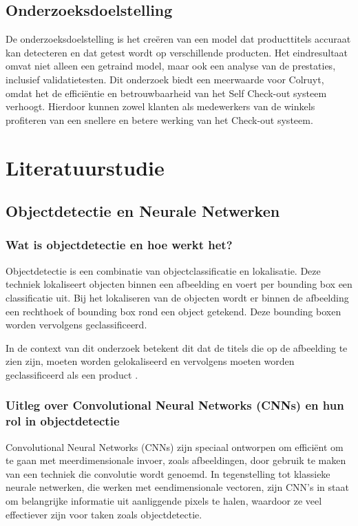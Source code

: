 \subsection*{Onderzoeksdoelstelling}
De onderzoeksdoelstelling is het creëren van een model dat producttitels accuraat kan detecteren en dat getest wordt op verschillende producten. Het eindresultaat omvat niet alleen een getraind model, maar ook een analyse van de prestaties, inclusief validatietesten. Dit onderzoek biedt een meerwaarde voor Colruyt, omdat het de efficiëntie en betrouwbaarheid van het Self Check-out systeem verhoogt. Hierdoor kunnen zowel klanten als medewerkers van de winkels profiteren van een snellere en betere werking van het Check-out systeem.


\section{Literatuurstudie}%
\label{sec:literatuurstudie}

\subsection{Objectdetectie en Neurale Netwerken}

\subsubsection{Wat is objectdetectie en hoe werkt het?}
Objectdetectie is een combinatie van objectclassificatie en lokalisatie. Deze techniek lokaliseert objecten binnen een afbeelding en voert per bounding box een classificatie uit. Bij het lokaliseren van de objecten wordt er binnen de afbeelding een rechthoek of bounding box rond een object getekend. Deze bounding boxen worden vervolgens geclassificeerd.

In de context van dit onderzoek betekent dit dat de titels die op de afbeelding te zien zijn, moeten worden gelokaliseerd en vervolgens moeten worden geclassificeerd als een product \autocite{wulteputteefficient}.

\subsubsection{Uitleg over Convolutional Neural Networks (CNNs) en hun rol in objectdetectie}
Convolutional Neural Networks (CNNs) zijn speciaal ontworpen om efficiënt om te gaan met meerdimensionale invoer, zoals afbeeldingen, door gebruik te maken van een techniek die convolutie wordt genoemd. In tegenstelling tot klassieke neurale netwerken, die werken met eendimensionale vectoren, zijn CNN's in staat om belangrijke informatie uit aanliggende pixels te halen, waardoor ze veel effectiever zijn voor taken zoals objectdetectie.

